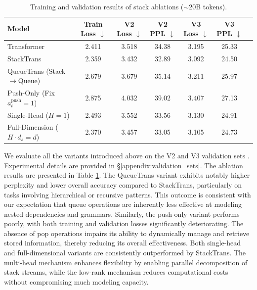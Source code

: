 \documentclass{article}
\DeclareRobustCommand{\method}{{\sc StackTrans}\xspace}
\begin{document}
\begin{table}[t]
\centering
\caption{Training and validation results of stack ablations ($\sim$20B tokens).
}
\label{tab:ablation_results}
\begin{tabular}{lcccccc}
\toprule
Model & Train Loss $\downarrow$ & V2 Loss $\downarrow$ & V2 PPL $\downarrow$ & V3 Loss $\downarrow$ & V3 PPL $\downarrow$ \\
\midrule
Transformer & 2.411 & 3.518 & 34.38 & 3.195 & 25.33 \\
\method           & 2.359 & 3.432 & 32.89 & 3.092 & 24.50 \\
\midrule
QueueTrans \scriptsize{(Stack$\rightarrow$Queue)}         & 2.679 & 3.679 & 35.14 & 3.211 & 25.97 \\
Push-Only \scriptsize{(Fix $a_t^\text{push}=1$)} & 2.875 & 4.032 & 39.02 & 3.407 & 27.13 \\
\midrule
Single-Head \scriptsize{($H=1$)}       & 2.493 & 3.552  & 33.56 & 3.130 & 24.91  \\
Full-Dimension \scriptsize{($H\cdot d_s=d$)}  & 2.370 & 3.457  & 33.05 & 3.105 & 24.73 \\
\bottomrule
\end{tabular}
\vspace{-10pt}
\end{table}

We evaluate all the variants introduced above on the V2 and V3 validation sets \citep{hyperconnect}. Experimental details are provided in \S\ref{appendix:validation_sets}.
The ablation results are presented in Table \ref{tab:ablation_results}.
The QueueTrans variant exhibits notably higher perplexity and lower overall accuracy compared to \method, particularly on tasks involving hierarchical or recursive patterns.
This outcome is consistent with our expectation that queue operations are inherently less effective at modeling nested dependencies and grammars.
Similarly, the push-only variant performs poorly, with both training and validation losses significantly deteriorating.
The absence of pop operations impairs its ability to dynamically manage and retrieve stored information, thereby reducing its overall effectiveness.
Both single-head and full-dimensional variants are consistently outperformed by \method. The multi-head mechanism enhances flexibility by enabling parallel decomposition of stack streams, while the low-rank mechanism reduces computational costs without compromising much modeling capacity.
\end{document}
